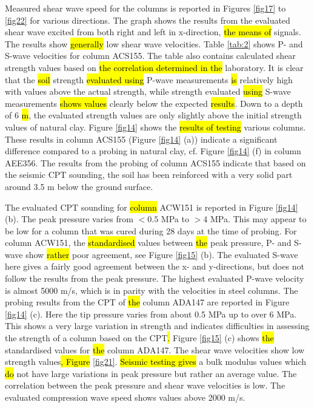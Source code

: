\documentclass[final,3p,times,onecolumn,authoryear]{elsarticle}
\begin{document}
Measured shear wave speed for the columns is reported in Figures \ref{fig17} to \ref{fig22} for various directions. The graph shows the results from the evaluated shear wave excited from both right and left in x-direction, \hl{the means of} signals. The results show\hl{ generally} low shear wave velocities. Table \ref{tab:2} shows P- and S-wave velocities for column ACS155. The table also contains calculated shear strength values based on \hl{the correlation determined in the }laboratory. It is clear that the\hl{ soil }strength \hl{evaluated using} P-wave measurements \hl{is} relatively high with values above the actual strength, while strength evaluated \hl{using} S-wave measurements \hl{shows values} clearly below the expected \hl{results}. Down to a depth of 6 \hl{m}, the evaluated strength values are only slightly above the initial strength values of natural clay. Figure \ref{fig14} shows the \hl{results of testing }various columns. These results in column ACS155 (Figure \ref{fig14} (a)) indicate a significant difference compared to a probing in natural clay, cf. Figure \ref{fig14} (f) in column AEE356. The results from the probing of column ACS155 indicate that based on the seismic CPT sounding, the soil has been reinforced with a very solid part around 3.5 m below the ground surface.

The evaluated CPT sounding for \hl{column} ACW151 is reported in Figure \ref{fig14} (b). The peak pressure varies from $<0.5$ MPa to $>4$ MPa. This may appear to be low for a column that was cured during 28 days at the time of probing. For column ACW151, the \hl{standardised} values between \hl{the }peak pressure, P- and S-wave show \hl{rather }poor agreement, see Figure \ref{fig15} (b). The evaluated S-wave here gives a fairly good agreement between the x- and y-directions, but does not follow the results from the peak pressure. The highest evaluated P-wave velocity is almost 5000 m/s, which is in parity with the velocities in steel columns. The probing results from the CPT\hl{ }of \hl{the }column ADA147 are reported in Figure \ref{fig14} (c). Here the tip pressure varies from about 0.5 MPa up to over 6 MPa. This shows a very large variation in strength and indicates difficulties in assessing the strength of a column based on the CPT\hl{. }Figure \ref{fig15} (c) shows \hl{the }standardised values for \hl{the }column ADA147. The shear wave velocities\hl{ }show low strength values\hl{, Figure }\ref{fig21}. \hl{Seismic testing gives} a bulk modulus values which \hl{do} not have large variations in peak pressure but rather an average value. The correlation between the peak pressure and shear wave velocities is low. The evaluated compression wave speed shows values above 2000 m/s.
\end{document}
